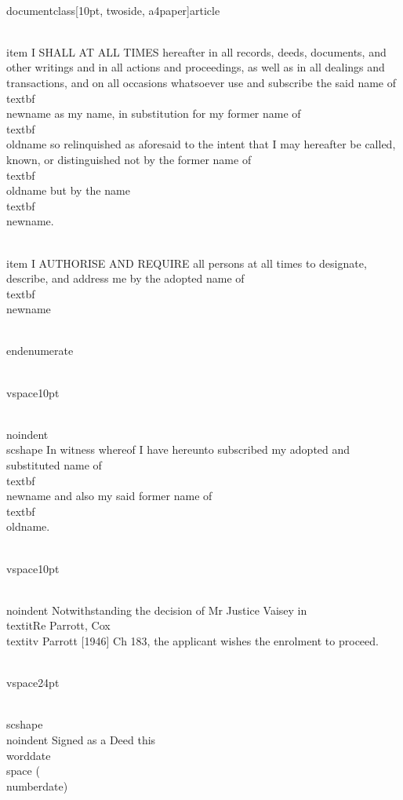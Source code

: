 \\documentclass[10pt, twoside, a4paper]{article}
\begin{document}
    \\item I SHALL AT ALL TIMES hereafter in all records, deeds,	documents, and other writings and in all actions and proceedings, as well as in all dealings and transactions, and on all occasions	whatsoever use and subscribe the said name of \\textbf{\\newname} as my name, in substitution for my former name of \\textbf{\\oldname} so relinquished as aforesaid to the intent that I may hereafter be called, known, or distinguished not by the former name of \\textbf{\\oldname} but by the name \\textbf{\\newname}.
	
    \\item I AUTHORISE AND REQUIRE all persons at all times to
	designate, describe, and address me by the adopted name of
	\\textbf{\\newname}

\\end{enumerate}

\\vspace{10pt}

\\noindent{\\scshape In witness} whereof I have hereunto subscribed my adopted and
substituted name of \\textbf{\\newname} and also my said former name of
\\textbf{\\oldname}.

\\vspace{10pt}

\\noindent Notwithstanding the decision of Mr Justice Vaisey in \\textit{Re} Parrott, Cox
\\textit{v} Parrott [1946] Ch 183, the applicant wishes the enrolment to proceed.

\\vspace{24pt}

{
	\\scshape
	\\noindent Signed as a Deed this \\worddate  \\space (\\numberdate)
}
\end{document}
